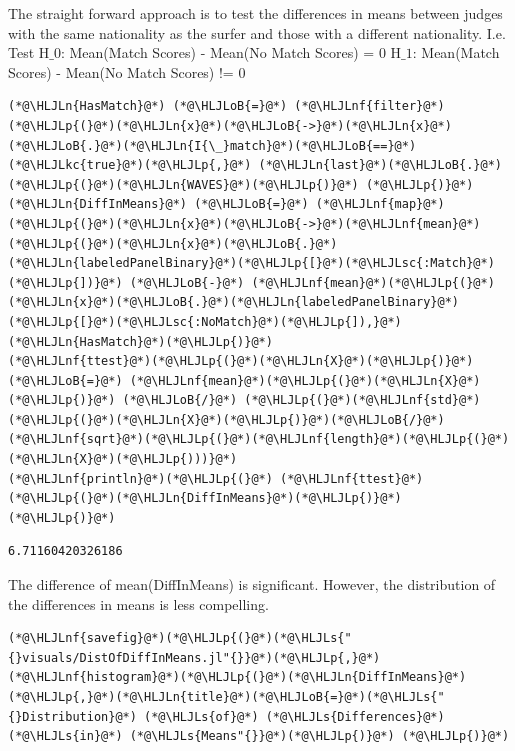 \documentclass[12pt,a4paper]{article}
\newcommand{\HLJLkc}[1]{\textcolor[RGB]{59,151,46}{\textit{#1}}}
\newcommand{\HLJLn}[1]{#1}
\newcommand{\HLJLnf}[1]{\textcolor[RGB]{66,102,213}{#1}}
\newcommand{\HLJLs}[1]{\textcolor[RGB]{201,61,57}{#1}}
\newcommand{\HLJLsc}[1]{\textcolor[RGB]{201,61,57}{#1}}
\newcommand{\HLJLoB}[1]{\textcolor[RGB]{102,102,102}{\textbf{#1}}}
\newcommand{\HLJLp}[1]{#1}
\begin{document}
The straight forward approach is to test the differences in means between judges with the same nationality as the surfer and those with a different nationality. I.e. Test H\ensuremath{\_0}: Mean(Match Scores) - Mean(No Match Scores) = 0 H\ensuremath{\_1}: Mean(Match Scores) - Mean(No Match Scores) != 0


\begin{lstlisting}
(*@\HLJLn{HasMatch}@*) (*@\HLJLoB{=}@*) (*@\HLJLnf{filter}@*)(*@\HLJLp{(}@*)(*@\HLJLn{x}@*)(*@\HLJLoB{->}@*)(*@\HLJLn{x}@*)(*@\HLJLoB{.}@*)(*@\HLJLn{I{\_}match}@*)(*@\HLJLoB{==}@*)(*@\HLJLkc{true}@*)(*@\HLJLp{,}@*) (*@\HLJLn{last}@*)(*@\HLJLoB{.}@*)(*@\HLJLp{(}@*)(*@\HLJLn{WAVES}@*)(*@\HLJLp{)}@*) (*@\HLJLp{)}@*)
(*@\HLJLn{DiffInMeans}@*) (*@\HLJLoB{=}@*) (*@\HLJLnf{map}@*)(*@\HLJLp{(}@*)(*@\HLJLn{x}@*)(*@\HLJLoB{->}@*)(*@\HLJLnf{mean}@*)(*@\HLJLp{(}@*)(*@\HLJLn{x}@*)(*@\HLJLoB{.}@*)(*@\HLJLn{labeledPanelBinary}@*)(*@\HLJLp{[}@*)(*@\HLJLsc{:Match}@*)(*@\HLJLp{])}@*) (*@\HLJLoB{-}@*) (*@\HLJLnf{mean}@*)(*@\HLJLp{(}@*)(*@\HLJLn{x}@*)(*@\HLJLoB{.}@*)(*@\HLJLn{labeledPanelBinary}@*)(*@\HLJLp{[}@*)(*@\HLJLsc{:NoMatch}@*)(*@\HLJLp{]),}@*) (*@\HLJLn{HasMatch}@*)(*@\HLJLp{)}@*)
(*@\HLJLnf{ttest}@*)(*@\HLJLp{(}@*)(*@\HLJLn{X}@*)(*@\HLJLp{)}@*) (*@\HLJLoB{=}@*) (*@\HLJLnf{mean}@*)(*@\HLJLp{(}@*)(*@\HLJLn{X}@*)(*@\HLJLp{)}@*) (*@\HLJLoB{/}@*) (*@\HLJLp{(}@*)(*@\HLJLnf{std}@*)(*@\HLJLp{(}@*)(*@\HLJLn{X}@*)(*@\HLJLp{)}@*)(*@\HLJLoB{/}@*)(*@\HLJLnf{sqrt}@*)(*@\HLJLp{(}@*)(*@\HLJLnf{length}@*)(*@\HLJLp{(}@*)(*@\HLJLn{X}@*)(*@\HLJLp{)))}@*)
(*@\HLJLnf{println}@*)(*@\HLJLp{(}@*) (*@\HLJLnf{ttest}@*)(*@\HLJLp{(}@*)(*@\HLJLn{DiffInMeans}@*)(*@\HLJLp{)}@*) (*@\HLJLp{)}@*)
\end{lstlisting}

\begin{lstlisting}
6.71160420326186
\end{lstlisting}


The difference of mean(DiffInMeans) is significant. However, the distribution of the differences in means is less compelling. 


\begin{lstlisting}
(*@\HLJLnf{savefig}@*)(*@\HLJLp{(}@*)(*@\HLJLs{"{}visuals/DistOfDiffInMeans.jl"{}}@*)(*@\HLJLp{,}@*) (*@\HLJLnf{histogram}@*)(*@\HLJLp{(}@*)(*@\HLJLn{DiffInMeans}@*)(*@\HLJLp{,}@*)(*@\HLJLn{title}@*)(*@\HLJLoB{=}@*)(*@\HLJLs{"{}Distribution}@*) (*@\HLJLs{of}@*) (*@\HLJLs{Differences}@*) (*@\HLJLs{in}@*) (*@\HLJLs{Means"{}}@*)(*@\HLJLp{)}@*) (*@\HLJLp{)}@*)
\end{lstlisting}
\end{document}
